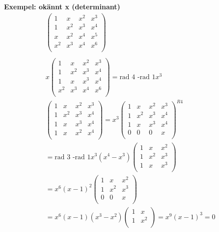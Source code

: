 \begin{multicols}{2}
\textbf{Exempel: okännt x (determinant)}
\begin{align*}
  &\left(\begin{array}{cccc}
    1   & x   & x^2 & x^3  \\
    1   & x^2 & x^3 & x^4  \\
    x   & x^2 & x^4 & x^5  \\
    x^2 & x^3 & x^4 & x^6  \\
  \end{array}\right) \\
  &\\
  &x\left(\begin{array}{cccc}
    1   & x   & x^2 & x^3  \\
    1   & x^2 & x^3 & x^4  \\
    1   & x   & x^3 & x^4  \\
    x^2 & x^3 & x^4 & x^6  \\
  \end{array}\right) = \text{rad 4 -rad 1} x^3  \\
  &\left(\begin{array}{cccc}
    1   & x   & x^2 & x^3  \\
    1   & x^2 & x^3 & x^4  \\
    1   & x   & x^3 & x^4  \\
    1   & x   & x^2 & x^4  \\
  \end{array}\right) =  x^3
  \left(\begin{array}{cccc}
    1   & x   & x^2 & x^3  \\
    1   & x^2 & x^3 & x^4  \\
    1   & x   & x^3 & x^4  \\
    0   & 0   & 0 & x     \\
  \end{array}\right)^{R4}  \\
  &=\text{rad 3 -rad 1} x^3(x^4-x^3)
  \left(\begin{array}{ccc}
    1   & x   & x^2  \\
    1   & x^2 & x^3  \\
    1   & x   & x^3  \\
  \end{array}\right) \\
  &= x^6(x-1)^2
  \left(\begin{array}{ccc}
    1   & x   & x^2  \\
    1   & x^2 & x^3  \\
    0   & 0   & x  \\
  \end{array}\right) \\
  &= x^6(x-1)(x^3-x^2)  
  \left(\begin{array}{cc}
    1   & x    \\
    1   & x^2  \\
  \end{array}\right) = x^9(x-1)^3=0
\end{align*}



\end{multicols}
